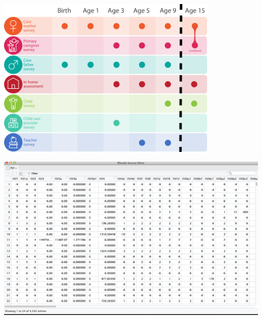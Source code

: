 \documentclass[aspectratio=169]{beamer}
\begin{document}
\begin{frame}

\begin{center}
\includegraphics[width=0.8\textwidth]{figures/ff_design_public2}
\end{center}

\end{frame}
\begin{frame}

\begin{center}
\includegraphics[width=\textwidth]{figures/ffc_rawdata_f5f}
\end{center}

\end{frame}
%
%
\end{document}
